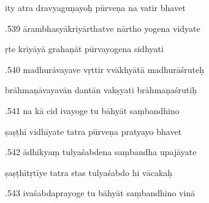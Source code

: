 \documentclass[article,12pt,a4paper]{memoir}%
\newcounter{parCount}
\begin{document}
	  
	  \pstart \leavevmode%
	ity atra dravyaguṇayoḥ pūrveṇa na vatir bhavet 
	{}
	\pend%
      

	  
	  \pstart {}.539 ārambhasyākriyārthatve nārtho yogena vidyate 
	{}
	\pend%
      

	  
	  \pstart \leavevmode%
	ṛte kriyāyā grahaṇāt pūrvayogena sidhyati 
	{}
	\pend%
      

	  
	  \pstart {}.540 madhurāvayave vṛttir vvākhyātā madhurāśruteḥ 
	{}
	\pend%
      

	  
	  \pstart \leavevmode%
	brāhmaṇāvayavān dantān vakṣyati brāhmaṇaśrutiḥ 
	{}
	\pend%
      

	  
	  \pstart {}.541 na kā cid ivayoge tu bāhyāt saṃbandhino 
	{}
	\pend%
      

	  
	  \pstart \leavevmode%
	ṣaṣṭhī vidhīyate tatra pūrveṇa pratyayo bhavet 
	{}
	\pend%
      

	  
	  \pstart {}.542 ādhikyaṃ tulyaśabdena saṃbandha upajāyate 
	{}
	\pend%
      

	  
	  \pstart \leavevmode%
	ṣaṣṭhītṛtīye tatra stas tulyaśabdo hi vācakaḥ 
	{}
	\pend%
      

	  
	  \pstart {}.543 ivaśabdaprayoge tu bāhyāt saṃbandhino vinā 
	{}
	\pend%
      
\end{document}

